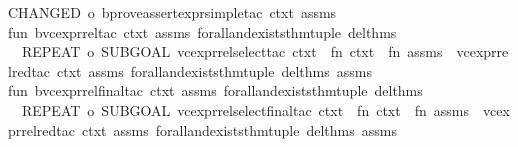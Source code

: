 \begin{isabellebody}
{\isacharparenleft}{\kern0pt}CHANGED\ o\ b{\isacharunderscore}{\kern0pt}prove{\isacharunderscore}{\kern0pt}assert{\isacharunderscore}{\kern0pt}expr{\isacharunderscore}{\kern0pt}simple{\isacharunderscore}{\kern0pt}tac\ ctxt\ assms\ {\isacharbrackleft}{\kern0pt}{\isacharbrackright}{\kern0pt}{\isacharparenright}{\kern0pt}\isanewline
{\isacharbrackright}{\kern0pt}\isanewline
\isanewline
fun\ b{\isacharunderscore}{\kern0pt}vc{\isacharunderscore}{\kern0pt}expr{\isacharunderscore}{\kern0pt}rel{\isacharunderscore}{\kern0pt}tac\ ctxt\ assms\ forall{\isacharunderscore}{\kern0pt}and{\isacharunderscore}{\kern0pt}exists{\isacharunderscore}{\kern0pt}thm{\isacharunderscore}{\kern0pt}tuple\ del{\isacharunderscore}{\kern0pt}thms\ {\isacharequal}{\kern0pt}\isanewline
\ \ REPEAT\ o\ SUBGOAL\ {\isacharparenleft}{\kern0pt}vc{\isacharunderscore}{\kern0pt}expr{\isacharunderscore}{\kern0pt}rel{\isacharunderscore}{\kern0pt}select{\isacharunderscore}{\kern0pt}tac\ ctxt\ \ {\isacharparenleft}{\kern0pt}fn\ ctxt\ {\isacharequal}{\kern0pt}{\isachargreater}{\kern0pt}\ fn\ assms\ {\isacharequal}{\kern0pt}{\isachargreater}{\kern0pt}\ vc{\isacharunderscore}{\kern0pt}expr{\isacharunderscore}{\kern0pt}rel{\isacharunderscore}{\kern0pt}red{\isacharunderscore}{\kern0pt}tac\ ctxt\ assms\ forall{\isacharunderscore}{\kern0pt}and{\isacharunderscore}{\kern0pt}exists{\isacharunderscore}{\kern0pt}thm{\isacharunderscore}{\kern0pt}tuple\ del{\isacharunderscore}{\kern0pt}thms{\isacharparenright}{\kern0pt}\ assms\ {\isacharparenright}{\kern0pt}\isanewline
\isanewline
fun\ b{\isacharunderscore}{\kern0pt}vc{\isacharunderscore}{\kern0pt}expr{\isacharunderscore}{\kern0pt}rel{\isacharunderscore}{\kern0pt}final{\isacharunderscore}{\kern0pt}tac\ ctxt\ assms\ forall{\isacharunderscore}{\kern0pt}and{\isacharunderscore}{\kern0pt}exists{\isacharunderscore}{\kern0pt}thm{\isacharunderscore}{\kern0pt}tuple\ del{\isacharunderscore}{\kern0pt}thms\ {\isacharequal}{\kern0pt}\isanewline
\ \ REPEAT\ o\ SUBGOAL\ {\isacharparenleft}{\kern0pt}vc{\isacharunderscore}{\kern0pt}expr{\isacharunderscore}{\kern0pt}rel{\isacharunderscore}{\kern0pt}select{\isacharunderscore}{\kern0pt}final{\isacharunderscore}{\kern0pt}tac\ ctxt\ \ {\isacharparenleft}{\kern0pt}fn\ ctxt\ {\isacharequal}{\kern0pt}{\isachargreater}{\kern0pt}\ fn\ assms\ {\isacharequal}{\kern0pt}{\isachargreater}{\kern0pt}\ vc{\isacharunderscore}{\kern0pt}expr{\isacharunderscore}{\kern0pt}rel{\isacharunderscore}{\kern0pt}red{\isacharunderscore}{\kern0pt}tac\ ctxt\ assms\ forall{\isacharunderscore}{\kern0pt}and{\isacharunderscore}{\kern0pt}exists{\isacharunderscore}{\kern0pt}thm{\isacharunderscore}{\kern0pt}tuple\ del{\isacharunderscore}{\kern0pt}thms{\isacharparenright}{\kern0pt}\ assms\ {\isacharparenright}{\kern0pt}\isanewline

\end{isabellebody}
